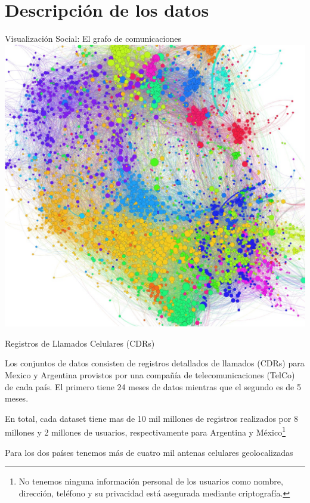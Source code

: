 \documentclass[xcolor=x11names]{beamer}
\begin{document}
\section{ Descripción de los datos}

\begin{frame}{Visualización Social: El grafo de comunicaciones}
		\center\
		\includegraphics[scale=0.24]{slides/Graph-screenshot.jpg}
\end{frame}

\begin{frame}{Registros de Llamados Celulares (CDRs)}

Los conjuntos de datos consisten de registros detallados de llamados (CDRs) para Mexico y Argentina provistos por una compañía de telecomunicaciones (TelCo) de cada país. El primero tiene 24 meses de datos mientras que el segundo es de 5 meses.

\medskip

En total, cada dataset tiene mas de 10 mil millones de registros realizados por 8 millones y 2 millones de usuarios, respectivamente para Argentina y México\footnote{No tenemos ninguna información personal de los usuarios como nombre, dirección, teléfono y su privacidad está asegurada mediante criptografía.}

\medskip
Para los dos países tenemos más de cuatro mil antenas celulares geolocalizadas

\end{frame}
\end{document}
